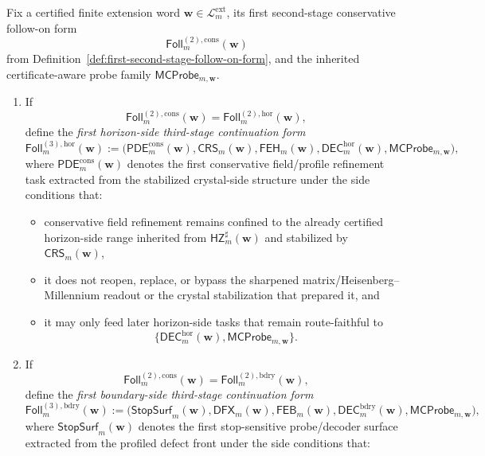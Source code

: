 \begin{definition}
\label{def:first-third-stage-continuation-form}
Fix a certified finite extension word \(\mathbf w\in\mathcal L^{\mathrm{ext}}_{m}\), its first second-stage conservative follow-on form
\[
  \mathsf{Foll}^{(2),\mathrm{cons}}_{m}(\mathbf w)
\]
from Definition~\ref{def:first-second-stage-follow-on-form}, and the inherited certificate-aware probe family \(\mathsf{MCProbe}_{m,\mathbf w}\).
\begin{enumerate}[label=(\roman*)]
  \item If
  \[
    \mathsf{Foll}^{(2),\mathrm{cons}}_{m}(\mathbf w)=\mathsf{Foll}^{(2),\mathrm{hor}}_{m}(\mathbf w),
  \]
  define the \emph{first horizon-side third-stage continuation form}
  \[
    \mathsf{Foll}^{(3),\mathrm{hor}}_{m}(\mathbf w)
    :=
    \bigl(\mathsf{PDE}^{\mathrm{cons}}_{m}(\mathbf w),\mathsf{CRS}_{m}(\mathbf w),\mathsf{FEH}_{m}(\mathbf w),\mathsf{DEC}^{\mathrm{hor}}_{m}(\mathbf w),\mathsf{MCProbe}_{m,\mathbf w}\bigr),
  \]
  where \(\mathsf{PDE}^{\mathrm{cons}}_{m}(\mathbf w)\) denotes the first conservative field/profile refinement task extracted from the stabilized crystal-side structure under the side conditions that:
  \begin{itemize}[leftmargin=2em]
    \item conservative field refinement remains confined to the already certified horizon-side range inherited from \(\mathsf{HZ}^{\sharp}_{m}(\mathbf w)\) and stabilized by \(\mathsf{CRS}_{m}(\mathbf w)\),
    \item it does not reopen, replace, or bypass the sharpened matrix/Heisenberg--Millennium readout or the crystal stabilization that prepared it, and
    \item it may only feed later horizon-side tasks that remain route-faithful to
    \[
      \{\mathsf{DEC}^{\mathrm{hor}}_{m}(\mathbf w),\mathsf{MCProbe}_{m,\mathbf w}\}.
    \]
  \end{itemize}
  \item If
  \[
    \mathsf{Foll}^{(2),\mathrm{cons}}_{m}(\mathbf w)=\mathsf{Foll}^{(2),\mathrm{bdry}}_{m}(\mathbf w),
  \]
  define the \emph{first boundary-side third-stage continuation form}
  \[
    \mathsf{Foll}^{(3),\mathrm{bdry}}_{m}(\mathbf w)
    :=
    \bigl(\mathsf{StopSurf}_{m}(\mathbf w),\mathsf{DFX}_{m}(\mathbf w),\mathsf{FEB}_{m}(\mathbf w),\mathsf{DEC}^{\mathrm{bdry}}_{m}(\mathbf w),\mathsf{MCProbe}_{m,\mathbf w}\bigr),
  \]
  where \(\mathsf{StopSurf}_{m}(\mathbf w)\) denotes the first stop-sensitive probe/decoder surface extracted from the profiled defect front under the side conditions that:

\end{enumerate}
\end{definition}
